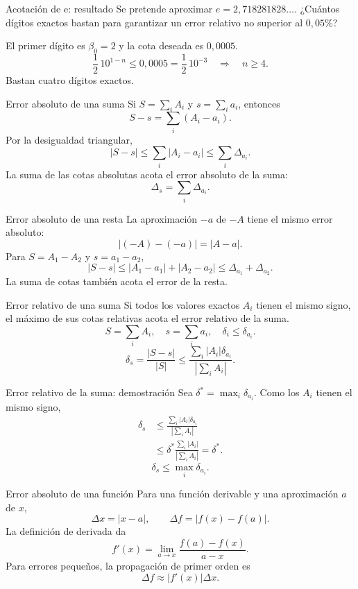 \documentclass[original_version/main.tex]{subfiles}
\begin{document}
\begin{frame}{Acotación de e: resultado}
Se pretende aproximar $e=2{,}718281828\ldots$. ¿Cuántos dígitos exactos bastan para garantizar un error relativo no superior al $0{,}05\%$?\par\medskip El primer dígito es $\beta_0=2$ y la cota deseada es $0{,}0005$.\[\frac12\,10^{1-n}\le0{,}0005=\frac12\,10^{-3}\quad\Longrightarrow\quad n\ge4.\]Bastan cuatro dígitos exactos.
\end{frame}

\begin{frame}{Error absoluto de una suma}
\small Si $S=\sum_iA_i$ y $s=\sum_i a_i$, entonces\[S-s=\sum_i(A_i-a_i).\]Por la desigualdad triangular,\[|S-s|\le\sum_i|A_i-a_i|\le\sum_i\Delta_{a_i}.\]La suma de las cotas absolutas acota el error absoluto de la suma:\[\boxed{\Delta_s=\sum_i\Delta_{a_i}.}\]
\end{frame}

\begin{frame}{Error absoluto de una resta}
La aproximación $-a$ de $-A$ tiene el mismo error absoluto:\[|(-A)-(-a)|=|A-a|.\]Para $S=A_1-A_2$ y $s=a_1-a_2$,\[|S-s|\le|A_1-a_1|+|A_2-a_2|\le\Delta_{a_1}+\Delta_{a_2}.\]La suma de cotas también acota el error de la resta.
\end{frame}

\begin{frame}{Error relativo de una suma}
Si todos los valores exactos $A_i$ tienen el mismo signo, el máximo de sus cotas relativas acota el error relativo de la suma.\[S=\sum_iA_i,\quad s=\sum_i a_i,\quad\delta_i\le\delta_{a_i}.\]\[\delta_s=\frac{|S-s|}{|S|}\le\frac{\sum_i|A_i|\delta_{a_i}}{|\sum_iA_i|}.\]
\end{frame}

\begin{frame}{Error relativo de la suma: demostración}
Sea $\delta^*=\max_i\delta_{a_i}$. Como los $A_i$ tienen el mismo signo,\begin{align*}\delta_s&\le\frac{\sum_i|A_i|\delta_{a_i}}{|\sum_iA_i|}\\&\le\delta^*\frac{\sum_i|A_i|}{|\sum_iA_i|}=\delta^*.\end{align*}\[\boxed{\delta_s\le\max_i\delta_{a_i}.}\]
\end{frame}

\begin{frame}{Error absoluto de una función}
Para una función derivable y una aproximación $a$ de $x$,\[\Delta x=|x-a|,\qquad\Delta f=|f(x)-f(a)|.\]La definición de derivada da\[f\prime(x)=\lim_{a\to x}\frac{f(a)-f(x)}{a-x}.\]Para errores pequeños, la propagación de primer orden es\[\Delta f\approx|f\prime(x)|\Delta x.\]
\end{frame}
\end{document}
